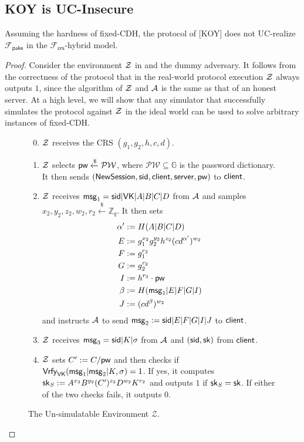 \subsection{KOY is UC-Insecure}
\begin{theorem}
	Assuming the hardness of fixed-CDH, the protocol of [KOY] does not UC-realize $\mathcal{F}_\mathsf{pake}$ in the $\mathcal{F}_{\mathsf{crs}}$-hybrid model.
\end{theorem}

\begin{proof}
	
	Consider the environment $\mathcal{Z}$ in  and the dummy adversary. It follows from the correctness of the protocol that in the real-world protocol execution $\mathcal{Z}$ always outputs $1$, since the algorithm of $\mathcal{Z}$ and $\mathcal{A}$ is the same as that of an honest server. At a high level, we will show that any simulator that successfully simulates the protocol against $\mathcal{Z}$ in the ideal world can be used to solve arbitrary instances of fixed-CDH.
	
	\begin{figure}[h]
		\begin{framed}\small
			\begin{enumerate}\setcounter{enumi}{-1}
				\item $\mathcal{Z}$ receives the CRS $(g_1, g_2, h, c, d)$.
				\item $\mathcal{Z}$ selects $\mathsf{pw}\xleftarrow{\$}\mathcal{PW}$, where $\mathcal{PW}\subseteq\mathbb{G}$ is the password dictionary. It then sends $(\mathsf{NewSession},\mathsf{sid},\mathsf{client},\mathsf{server},\mathsf{pw})$ to $\mathsf{client}$.
				\item $\mathcal{Z}$ receives $\mathsf{msg}_{1} = \mathsf{sid}|\mathsf{VK}|A|B|C|D$ from $\mathcal{A}$ and samples $x_2, y_2, z_2, w_2, r_2\xleftarrow{\$}\mathbb{Z}_q$. It then sets 
				\begin{align*}
					\alpha'&:=H(A|B|C|D)\\
					E &:= g_1^{x_2}g_2^{y_2}h^{z_2}(cd^{\alpha'})^{w_2}\\
					F &:= g_1^{r_2}\\
					G &:= g_2^{r_2}\\
					I &:= h^{r_2}\cdot\mathsf{pw}\\
					\beta &:= H(\mathsf{msg}_{1}|E|F|G|I)\\
					J &:= (cd^{\beta})^{w_2}
				\end{align*}
				and instructs $\mathcal{A}$ to send $\mathsf{msg}_{2} := \mathsf{sid}|E|F|G|I|J$ to $\mathsf{client}$. 
				\item $\mathcal{Z}$ receives $\mathsf{msg}_{3}=\mathsf{sid}|K|\sigma$ from $\mathcal{A}$ and $(\mathsf{sid}, \mathsf{sk})$ from $\mathsf{client}$.
				\item $\mathcal{Z}$ sets $C':=C/\mathsf{pw}$ and then checks if $\mathsf{Vrfy}_{\mathsf{VK}}(\mathsf{msg}_{1}|\mathsf{msg}_{2}|K,\sigma)=1$. If yes, it computes $\mathsf{sk}_S:=A^{x_2}B^{y_2}(C')^{z_2}D^{w_2}K^{r_2}$ and outputs $1$ if $\mathsf{sk}_S=\mathsf{sk}$. If either of the two checks fails, it outputs $0$.
			\end{enumerate}
		\end{framed}
		\caption{The Un-simulatable Environment $\mathcal{Z}$.}
		\label{fig:adv}
	\end{figure}
	

\end{proof}
